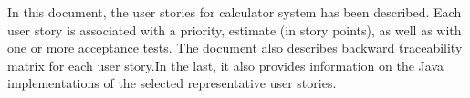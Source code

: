 In this document, the user stories for calculator system has been described. Each user story is associated with a priority, estimate (in story points), as well as with one or more acceptance tests. The document also describes backward traceability matrix for each user story.In the last, it also provides information on the Java implementations of the selected representative user stories.
